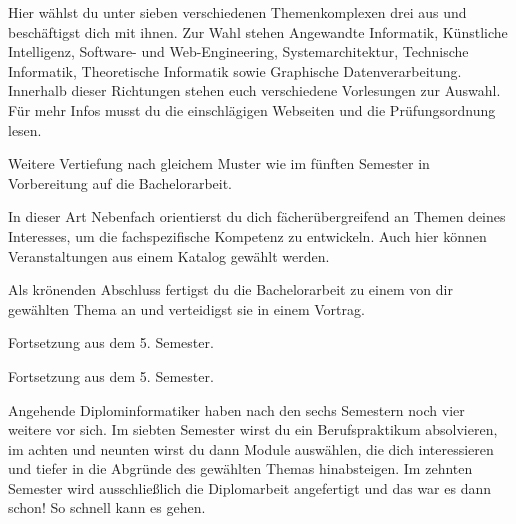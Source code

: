 Hier wählst du unter sieben verschiedenen Themenkomplexen drei aus und beschäftigst dich mit ihnen.
Zur Wahl stehen Angewandte Informatik, Künstliche Intelligenz, Software- und Web-Engineering, Systemarchitektur, Technische Informatik, Theoretische Informatik sowie Graphische Datenverarbeitung.
Innerhalb dieser Richtungen stehen euch verschiedene Vorlesungen zur Auswahl.
Für mehr Infos musst du die einschlägigen Webseiten und die Prüfungsordnung lesen.


Weitere Vertiefung nach gleichem Muster wie im fünften Semester in Vorbereitung auf die Bachelorarbeit.

In dieser Art Nebenfach orientierst du dich fächerübergreifend an Themen deines Interesses, um die fachspezifische Kompetenz zu entwickeln.
Auch hier können Veranstaltungen aus einem Katalog gewählt werden.

Als krönenden Abschluss fertigst du die Bachelorarbeit zu einem von dir gewählten Thema an und verteidigst sie in einem Vortrag.

Fortsetzung aus dem 5. Semester.

Fortsetzung aus dem 5. Semester.


Angehende Diplominformatiker haben nach den sechs Semestern noch vier weitere vor sich.
Im siebten Semester wirst du ein Berufspraktikum absolvieren, im achten und neunten wirst du dann Module auswählen, die dich interessieren und tiefer in die Abgründe des gewählten Themas hinabsteigen.
Im zehnten Semester wird ausschließlich die Diplomarbeit angefertigt und das war es dann schon!
So schnell kann es gehen.

